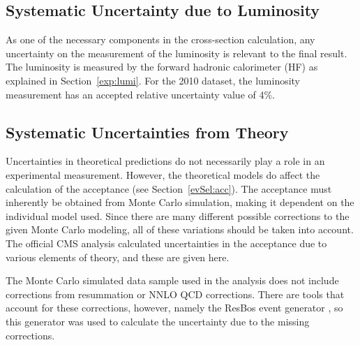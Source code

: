 \subsection{Systematic Uncertainty due to Luminosity}
\label{anMeth:SystsLumi}


As one of the necessary components in the 
cross-section calculation, 
any uncertainty on the measurement of the luminosity 
is relevant to the final result.  
The luminosity is measured by the forward hadronic calorimeter (HF) 
as explained in Section~\ref{exp:lumi}.  
For the 2010 dataset, 
the luminosity measurement has an accepted 
relative uncertainty value of 4\%.  %

\subsection{Systematic Uncertainties from Theory}
\label{anMeth:SystsTheory}



Uncertainties in theoretical predictions do not 
necessarily play a role in an experimental measurement.  
However, the theoretical models do affect the 
calculation of the acceptance (see Section~\ref{evSel:acc}).  
The acceptance must inherently be obtained from 
Monte Carlo simulation, making it dependent on the 
individual model used.  
Since there are many different possible corrections 
to the given Monte Carlo modeling, 
all of these variations should be taken into account.  
The official CMS \Zee analysis calculated %
uncertainties in the acceptance due to 
various elements of theory, 
and these are given here.  




The Monte Carlo simulated data sample used in the analysis 
does not include corrections from resummation or 
NNLO QCD corrections.  
There are tools that account for these corrections, 
however, 
namely the ResBos event generator \cite{resbos}, 
so this generator was used to 
calculate the uncertainty due to the missing corrections.  


